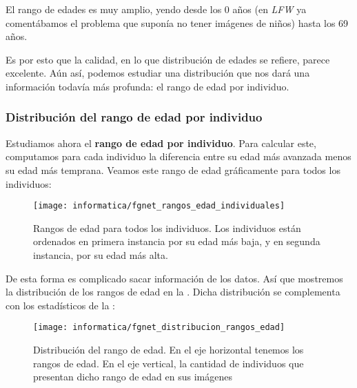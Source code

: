 El rango de edades es muy amplio, yendo desde los 0 años (en \textit{LFW} ya comentábamos el problema que suponía no tener imágenes de niños) hasta los 69 años.

Es por esto que la calidad, en lo que distribución de edades se refiere, parece excelente. Aún así, podemos estudiar una distribución que nos dará una información todavía más profunda: el rango de edad por individuo.

\subsubsection{Distribución del rango de edad por individuo} \label{isubsubs:fgnet_rango_edades}

Estudiamos ahora el \textbf{rango de edad por individuo}. Para calcular este, computamos para cada individuo la diferencia entre su edad más avanzada menos su edad más temprana. Veamos este rango de edad gráficamente para todos los individuos:

\begin{figure}[H]
    \centering
    \texttt{[image: informatica/fgnet\_rangos\_edad\_individuales]}
    \caption{Rangos de edad para todos los individuos. Los individuos están ordenados en primera instancia por su edad más baja, y en segunda instancia, por su edad más alta.}
    \label{img:fgnet_rangos_individuales}
\end{figure}

De esta forma es complicado sacar información de los datos. Así que mostremos la distribución de los rangos de edad en la . Dicha distribución se complementa con los estadísticos de la :

\begin{figure}[h!]
    \centering
    \texttt{[image: informatica/fgnet\_distribucion\_rangos\_edad]}
    \caption{Distribución del rango de edad. En el eje horizontal tenemos los rangos de edad. En el eje vertical, la cantidad de individuos que presentan dicho rango de edad en sus imágenes}
    \label{img:fgnet_rangos_distribucion}
\end{figure}

